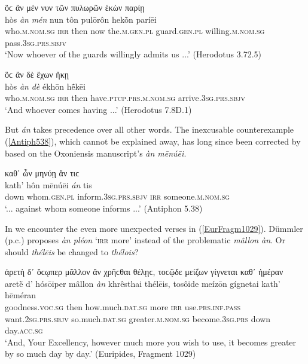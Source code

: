 \begin{exe}
\ex ὃϲ ἂν μέν νυν τῶν πυλωρῶν ἑκὼν παρίῃ\\
\gll hòs \emph{àn} \emph{mén} nun tôn pulōrôn hekṑn paríēi\\
who.\textsc{m.nom.sg} \textsc{irr} then now the.\textsc{m.gen.pl} guard.\textsc{gen.pl} willing.\textsc{m.nom.sg} pass.\textsc{3sg.prs.sbjv}\\
\trans `Now whoever of the guards willingly admits us ...' (Herodotus 3.72.5)
\label{Hdt3725}
\end{exe}

\begin{exe}
\ex ὃϲ ἂν δὲ ἔχων ἥκῃ\\
\gll hòs \emph{àn} \emph{dè} ékhōn hḗkēi\\
who.\textsc{m.nom.sg} \textsc{irr} then have.\textsc{ptcp.prs.m.nom.sg}
arrive.\textsc{3sg.prs.sbjv}\\
\trans `And whoever comes having ...' (Herodotus 7.8D.1)
\label{Hdt78D1}
\end{exe}

But \emph{án} takes precedence over all other words. The inexcusable counterexample (\ref{Antiph538}), which cannot be explained away, has long since been corrected by \citet[78]{Maetzner1838} based on the Oxoniensis manuscript's \textit{àn mēnúēi}.

\begin{exe}
\ex καθ᾽ ὧν μηνύῃ ἄν τιϲ\\
\gll kath' hôn mēnúēi \emph{án} tis\\
down whom.\textsc{gen.pl} inform.\textsc{3sg.prs.sbjv} \textsc{irr} someone.\textsc{m.nom.sg}\\
\trans `... against whom someone informs ...' (Antiphon 5.38)
\label{Antiph538}
\end{exe}

In \citet[688]{Nauck1889} we encounter the even more unexpected verses in (\ref{EurFragm1029}). Dümmler (p.c.) proposes \emph{àn pléon} `\textsc{irr} more' instead of the problematic \emph{mâllon àn}. Or should \emph{thélēis} be changed to \emph{thélois}?

\begin{exe}
\ex ἀρετὴ δ᾽ ὅϲῳπερ μᾶλλον ἂν χρῆϲθαι θέλῃϲ, τοϲῷδε μείζων γίγνεται καθ᾽ ἡμέραν\\
\gll aretḕ d' hósōiper mâllon \emph{àn} khrêsthai thélēis, tosôide meízōn gígnetai kath' hēméran\\
goodness.\textsc{voc.sg} then how.much.\textsc{dat.sg} more
\textsc{irr} use.\textsc{prs.inf.pass} want.\textsc{2sg.prs.sbjv} so.much.\textsc{dat.sg} greater.\textsc{m.nom.sg} become.\textsc{3sg.prs} down day.\textsc{acc.sg}\\
\trans `And, Your Excellency, however much more you wish to use, it becomes greater by so much day by day.' (Euripides, Fragment 1029)
\label{EurFragm1029}
\end{exe}

